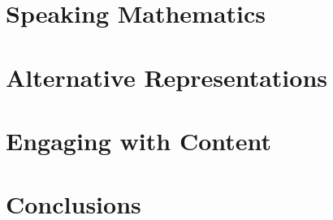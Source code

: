 \documentclass{sig-alternate}
\begin{document}
\section{Speaking Mathematics}
\label{sec:translate}

\section{Alternative Representations}
\label{sec:alternative}

\section{Engaging with Content}
\label{sec:explore}


\section{Conclusions}
\label{sec:conc}


 
\end{document}
